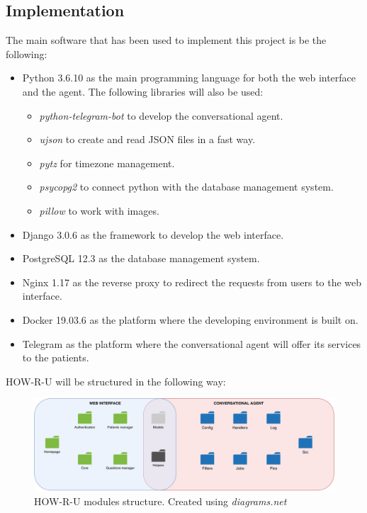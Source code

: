 \documentclass[12pt,english]{article}
\begin{document}
\subsection{Implementation}

The main software that has been used to implement this project is be the following:
\begin{itemize}
  \item Python 3.6.10 \cite{python} as the main programming language for both the web interface and the agent. The following libraries will also be used:
  \begin{itemize}
    \item \emph{python-telegram-bot} to develop the conversational agent.
    \item \emph{ujson} to create and read JSON files in a fast way.
    \item \emph{pytz} for timezone management.
    \item \emph{psycopg2} to connect python with the database management system.
    \item \emph{pillow} to work with images.
  \end{itemize}
  \item Django 3.0.6 \cite{django} as the framework to develop the web interface.
  \item PostgreSQL 12.3 \cite{postgres} as the database management system.
  \item Nginx 1.17 \cite{nginx} as the reverse proxy to redirect the requests from users to the web interface.
  \item Docker 19.03.6 \cite{docker} as the platform where the developing environment is built on.
  \item Telegram \cite{Telegram} as the platform where the conversational agent will offer its services to the patients.
\end{itemize}

HOW-R-U will be structured in the following way:

\begin{figure}[H]
  \centering
    \includegraphics[width=\textwidth]{repo_structure.pdf}
    \caption{HOW-R-U modules structure. Created using \emph{diagrams.net} \protect\cite{drawio}}
\end{figure}
\end{document}
